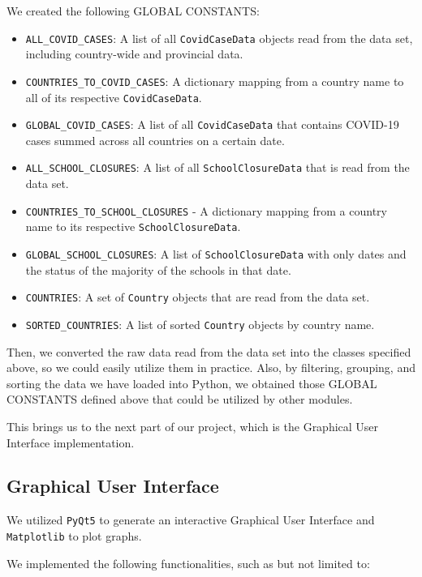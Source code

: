 \documentclass[fontsize=11pt]{article}
\begin{document}
    We created the following GLOBAL CONSTANTS:

    \begin{itemize}
        \item \verb|ALL_COVID_CASES|: A list of all \verb|CovidCaseData| objects read from the data set, including country-wide and provincial data.
        \item \verb|COUNTRIES_TO_COVID_CASES|: A dictionary mapping from a country name to all of its respective \verb|CovidCaseData|.
        \item \verb|GLOBAL_COVID_CASES|: A list of all \verb|CovidCaseData| that contains COVID-19 cases summed across all countries on a certain date.
        \item \verb|ALL_SCHOOL_CLOSURES|: A list of all \verb|SchoolClosureData| that is read from the data set.
        \item \verb|COUNTRIES_TO_SCHOOL_CLOSURES| - A dictionary mapping from a country name to its respective \verb|SchoolClosureData|.
        \item \verb|GLOBAL_SCHOOL_CLOSURES|: A list of \verb|SchoolClosureData| with only dates and the status of the majority of the schools in that date.
        \item \verb|COUNTRIES|: A set of \verb|Country| objects that are read from the data set.
        \item \verb|SORTED_COUNTRIES|: A list of sorted \verb|Country| objects by country name.
    \end{itemize}

    Then, we converted the raw data read from the data set into the classes specified above, so we could easily utilize them in practice. Also, by filtering, grouping, and sorting the data we have loaded into Python, we obtained those GLOBAL CONSTANTS defined above that could be utilized by other modules.

    This brings us to the next part of our project, which is the Graphical User Interface implementation.

    \subsection{Graphical User Interface}

    We utilized \verb|PyQt5| to generate an interactive Graphical User Interface and \verb|Matplotlib| to plot graphs.

    We implemented the following functionalities, such as but not limited to:
\end{document}
